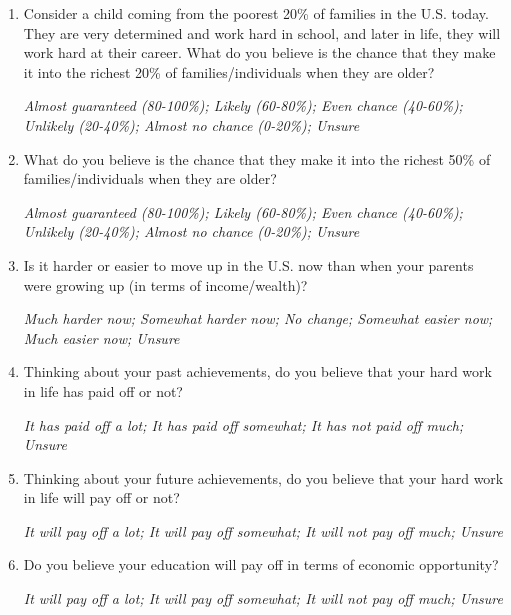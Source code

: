 \documentclass[11pt, headsepline]{article}
\begin{document}
\begin{enumerate}[resume]

    \item Consider a child coming from the poorest 20\% of families in the U.S. today. They are very determined and work hard in school, and later in life, they will work hard at their career. What do you believe is the chance that they make it into the richest 20\% of families/individuals when they are older?

    \textit{Almost guaranteed (80-100\%); Likely (60-80\%); Even chance (40-60\%); Unlikely (20-40\%); Almost no chance (0-20\%); Unsure}

    \item What do you believe is the chance that they make it into the richest 50\% of families/individuals when they are older?

    \textit{Almost guaranteed (80-100\%); Likely (60-80\%); Even chance (40-60\%); Unlikely (20-40\%); Almost no chance (0-20\%); Unsure}

    \item Is it harder or easier to move up in the U.S. now than when your parents were growing up (in terms of income/wealth)?

    \textit{Much harder now; Somewhat harder now; No change; Somewhat easier now; Much easier now; Unsure}

    \item Thinking about your past achievements, do you believe that your hard work in life has paid off or not?

    \textit{It has paid off a lot; It has paid off somewhat; It has not paid off much; Unsure}

    \item Thinking about your future achievements, do you believe that your hard work in life will pay off or not?

    \textit{It will pay off a lot; It will pay off somewhat; It will not pay off much; Unsure}

    \item Do you believe your education will pay off in terms of economic opportunity?

    \textit{It will pay off a lot; It will pay off somewhat; It will not pay off much; Unsure}
    
\end{enumerate}
\end{document}
